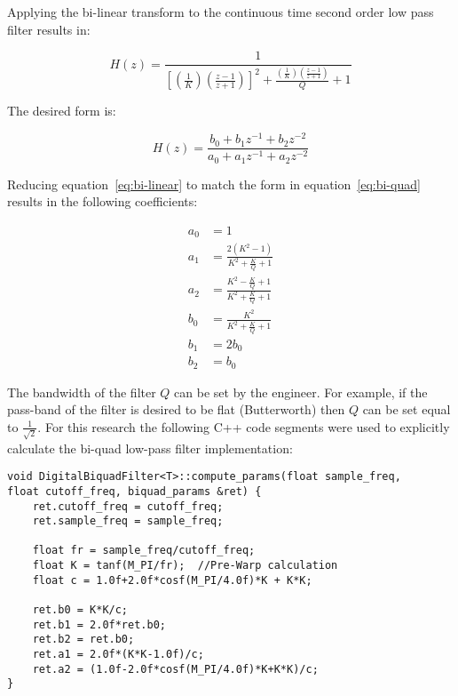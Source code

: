 Applying the bi-linear transform to the continuous time second order low pass filter results in:

\begin{equation}\label{eq:bi-linear}
	H(z) = \frac{1}{ \left[\left(\frac{1}{K}\right)\left(\frac{z-1}{z+1}\right)\right]^2+\frac{ \left(\frac{1}{K}\right)\left(\frac{z-1}{z+1}\right)}{Q}+1}
\end{equation}

The desired form is:

\begin{equation}\label{eq:bi-quad}
	H(z) = \frac{b_0 + b_1 z^{-1} + b_2 z^{-2}}{a_0 + a_1 z^{-1} + a_2 z^{-2}}
\end{equation}

Reducing equation~\ref{eq:bi-linear} to match the form in equation~\ref{eq:bi-quad} results in the following coefficients:

\begin{equation}
\begin{split}
	a_0 &= 1 \\
	a_1 &= \frac{2(K^2-1)}{K^2+\frac{K}{Q}+1} \\
	a_2 &= \frac{K^2-\frac{K}{Q}+1}{K^2+\frac{K}{Q}+1} \\
	b_0 &= \frac{K^2}{K^2+\frac{K}{Q}+1} \\
	b_1 &= 2b_0 \\
	b_2 &= b_0 	
\end{split}
\end{equation}

The bandwidth of the filter $Q$ can be set by the engineer.  For example, if the pass-band of the filter is desired to be flat (Butterworth) then $Q$ can be set equal to $\frac{1}{\sqrt{2}}$.  For this research the following C++ code segments were used to explicitly calculate the bi-quad low-pass filter implementation: \newline

\begin{lstlisting}
void DigitalBiquadFilter<T>::compute_params(float sample_freq, 
float cutoff_freq, biquad_params &ret) {
    ret.cutoff_freq = cutoff_freq;
    ret.sample_freq = sample_freq;

    float fr = sample_freq/cutoff_freq;
    float K = tanf(M_PI/fr);  //Pre-Warp calculation
    float c = 1.0f+2.0f*cosf(M_PI/4.0f)*K + K*K;

    ret.b0 = K*K/c;
    ret.b1 = 2.0f*ret.b0;
    ret.b2 = ret.b0;
    ret.a1 = 2.0f*(K*K-1.0f)/c;
    ret.a2 = (1.0f-2.0f*cosf(M_PI/4.0f)*K+K*K)/c;
}
\end{lstlisting}

